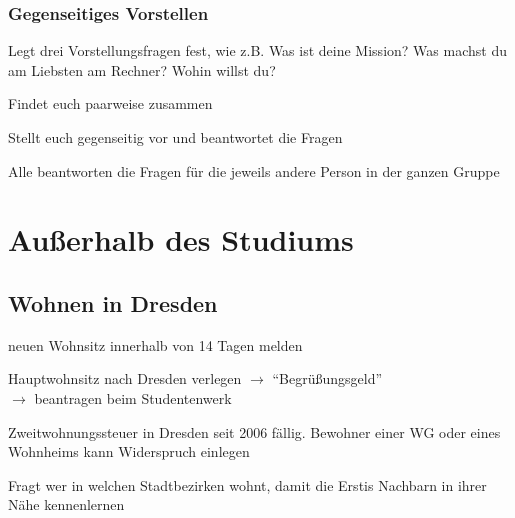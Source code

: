 \documentclass[a4paper,12pt]{report}
\begin{document}
\subsubsection{Gegenseitiges Vorstellen}
\begin{itemize*}
	\item Legt drei Vorstellungsfragen fest, wie z.B. Was ist deine Mission? Was machst du am Liebsten am Rechner? Wohin willst du?
	\item Findet euch paarweise zusammen
	\item Stellt euch gegenseitig vor und beantwortet die Fragen
	\item Alle beantworten die Fragen für die jeweils andere Person in der ganzen Gruppe
\end{itemize*}

\section{Außerhalb des Studiums}

\subsection{Wohnen in Dresden}
\begin{itemize*}
	\item neuen Wohnsitz innerhalb von 14 Tagen melden
	\item Hauptwohnsitz nach Dresden verlegen $\rightarrow$  \enquote{Begrüßungsgeld}\\
	$\rightarrow$ beantragen beim Studentenwerk
	\item Zweitwohnungssteuer in Dresden seit 2006 fällig. Bewohner einer WG oder eines Wohnheims kann Widerspruch einlegen
	\item Fragt wer in welchen Stadtbezirken wohnt, damit die Erstis Nachbarn in ihrer Nähe kennenlernen
\end{itemize*}
\end{document}
